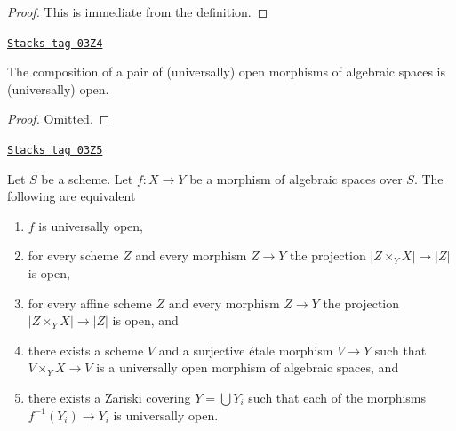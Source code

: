 \begin{proof}
This is immediate from the definition.
\end{proof}

\begin{lemma}
\label{spaces-morphisms-lemma-composition-open}
\href{https://stacks.math.columbia.edu/tag/03Z4}{\texttt{Stacks tag 03Z4}}

The composition of a pair of (universally) open morphisms of algebraic spaces
is (universally) open.
\end{lemma}

\begin{proof}
Omitted.
\end{proof}

\begin{lemma}
\label{spaces-morphisms-lemma-universally-open-local}
\href{https://stacks.math.columbia.edu/tag/03Z5}{\texttt{Stacks tag 03Z5}}

Let $S$ be a scheme. Let $f : X \to Y$ be a morphism of algebraic spaces
over $S$. The following are equivalent
\begin{enumerate}
\item $f$ is universally open,
\item for every scheme $Z$ and every morphism $Z \to Y$
the projection $|Z \times_Y X| \to |Z|$ is open,
\item for every affine scheme $Z$ and every morphism $Z \to Y$
the projection $|Z \times_Y X| \to |Z|$ is open, and
\item there exists a scheme $V$ and a surjective \'etale morphism
$V \to Y$ such that $V \times_Y X \to V$ is a universally open morphism
of algebraic spaces, and
\item there exists a Zariski covering $Y = \bigcup Y_i$ such that
each of the morphisms $f^{-1}(Y_i) \to Y_i$ is universally open.
\end{enumerate}
\end{lemma}

